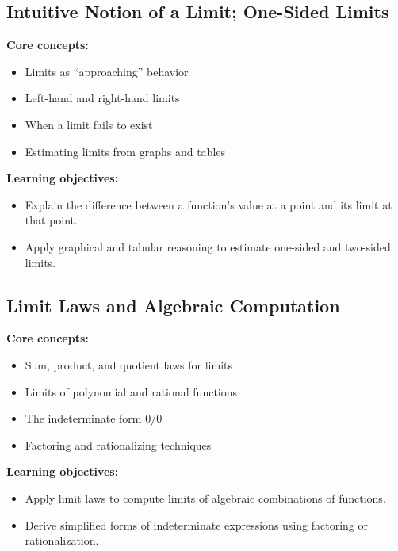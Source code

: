 \documentclass{article}
\begin{document}
\subsection{Intuitive Notion of a Limit; One-Sided Limits}
\textbf{Core concepts:}
\begin{itemize}[leftmargin=*]
  \item Limits as ``approaching'' behavior
  \item Left-hand and right-hand limits
  \item When a limit fails to exist
  \item Estimating limits from graphs and tables
\end{itemize}
\textbf{Learning objectives:}
\begin{itemize}[leftmargin=*]
  \item Explain the difference between a function's value at a point and its limit at that point.
  \item Apply graphical and tabular reasoning to estimate one-sided and two-sided limits.
\end{itemize}

\subsection{Limit Laws and Algebraic Computation}
\textbf{Core concepts:}
\begin{itemize}[leftmargin=*]
  \item Sum, product, and quotient laws for limits
  \item Limits of polynomial and rational functions
  \item The indeterminate form $0/0$
  \item Factoring and rationalizing techniques
\end{itemize}
\textbf{Learning objectives:}
\begin{itemize}[leftmargin=*]
  \item Apply limit laws to compute limits of algebraic combinations of functions.
  \item Derive simplified forms of indeterminate expressions using factoring or rationalization.
\end{itemize}
\end{document}
